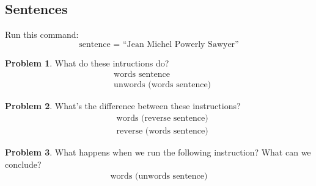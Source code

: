 \documentclass[a4paper,10pt]{article}
\theoremstyle{definition}
\newtheorem{problem}{Problem}[section]
\begin{document}
\subsection*{Sentences}
Run this command:
\[\text{sentence = ``Jean Michel Powerly Sawyer''}\]
\begin{problem}
    What do these intructions do?
    \begin{align*}
        &\text{words sentence}\\
        &\text{unwords (words sentence)}
    \end{align*}
\end{problem}

\begin{problem}
    What's the difference between these instructions?
    \begin{align*}
        &\text{words (reverse sentence)}\\
        &\text{reverse (words sentence)}
    \end{align*}
\end{problem}

\begin{problem}
    What happens when we run the following instruction? What can we conclude?
    \begin{align*}
        \text{words (unwords sentence)}
    \end{align*}
\end{problem}
\end{document}
